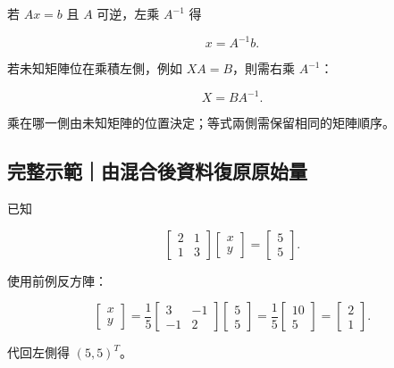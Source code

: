 \documentclass[11pt,a4paper]{article}
\begin{document}
若 \(Ax=b\) 且 \(A\) 可逆，左乘 \(A^{-1}\) 得

\[
x=A^{-1}b.
\]

若未知矩陣位在乘積左側，例如 \(XA=B\)，則需右乘 \(A^{-1}\)：

\[
X=BA^{-1}.
\]

乘在哪一側由未知矩陣的位置決定；等式兩側需保留相同的矩陣順序。

\begin{HandoutWorkedExample}

\subsection{完整示範｜由混合後資料復原原始量}\label{ux5b8cux6574ux793aux7bc4ux7531ux6df7ux5408ux5f8cux8cc7ux6599ux5fa9ux539fux539fux59cbux91cf}

已知

\[
\begin{bmatrix}2&1\\1&3\end{bmatrix}
\begin{bmatrix}x\\y\end{bmatrix}
=
\begin{bmatrix}5\\5\end{bmatrix}.
\]

使用前例反方陣：

\[
\begin{bmatrix}x\\y\end{bmatrix}
=\frac15
\begin{bmatrix}3&-1\\-1&2\end{bmatrix}
\begin{bmatrix}5\\5\end{bmatrix}
=\frac15\begin{bmatrix}10\\5\end{bmatrix}
=\boxed{\begin{bmatrix}2\\1\end{bmatrix}}.
\]

代回左側得 \((5,5)^T\)。

\end{HandoutWorkedExample}
\end{document}

